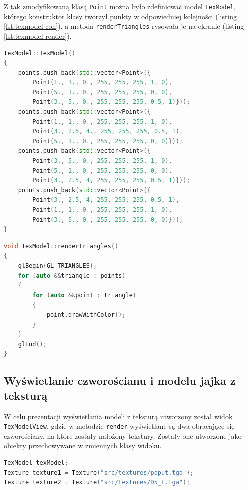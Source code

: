 Z tak zmodyfikowaną klasą \lstinline{Point} można było zdefiniować model \lstinline{TexModel}, którego konstruktor klasy tworzył punkty w odpowiedniej kolejności (listing \ref{lst:texmodel-con}), a metoda \lstinline{renderTriangles} rysowała je na ekranie (listing \ref{lst:texmodel-render}). 
\begin{lstlisting}[language=C++, caption=Konstruktor klasy \lstinline{TexModel}., label={lst:texmodel-con}]
TexModel::TexModel()
{
    points.push_back(std::vector<Point>({
        Point(1., 1., 0., 255, 255, 255, 1, 0),
        Point(5., 1., 0., 255, 255, 255, 0, 0),
        Point(3., 5., 0., 255, 255, 255, 0.5, 1)}));
    points.push_back(std::vector<Point>({
        Point(1., 1., 0., 255, 255, 255, 1, 0),
        Point(3., 2.5, 4., 255, 255, 255, 0.5, 1),
        Point(5., 1., 0., 255, 255, 255, 0, 0)}));
    points.push_back(std::vector<Point>({
        Point(3., 5., 0., 255, 255, 255, 1, 0),
        Point(5., 1., 0., 255, 255, 255, 0, 0),
        Point(3., 2.5, 4, 255, 255, 255, 0.5, 1)}));
    points.push_back(std::vector<Point>({
        Point(3., 2.5, 4, 255, 255, 255, 0.5, 1),
        Point(1., 1., 0., 255, 255, 255, 1, 0),
        Point(3., 5., 0., 255, 255, 255, 0, 0)}));
}
\end{lstlisting}
\clearpage
\begin{lstlisting}[language=C++, caption=Metoda \lstinline{renderTriangles} klasy \lstinline{TexModel}., label={lst:texmodel-render}]
void TexModel::renderTriangles()
{
    glBegin(GL_TRIANGLES);
    for (auto &&triangle : points)
    {
        for (auto &&point : triangle)
        {
            point.drawWithColor();
        }
    }
    glEnd();
}
\end{lstlisting}

\subsection{Wyświetlanie czworościanu i modelu jajka z teksturą}

W celu prezentacji wyświetlania modeli z teksturą utworzony został widok \lstinline{TexModelView}, gdzie w metodzie \lstinline{render} wyświetlane są dwa obracające się czworościany, na które zostały nałożony tekstury. Zostały one utworzone jako obiekty przechowywane w zmiennych klasy widoku.
\begin{lstlisting}[language=C++, caption=Zmienne klasy \lstinline{TexModelView} odpowiedzialne za model i tekstury., label={lst:texmodelview-hpp}]
TexModel texModel;
Texture texture1 = Texture("src/textures/paput.tga");
Texture texture2 = Texture("src/textures/D5_t.tga");
\end{lstlisting}

